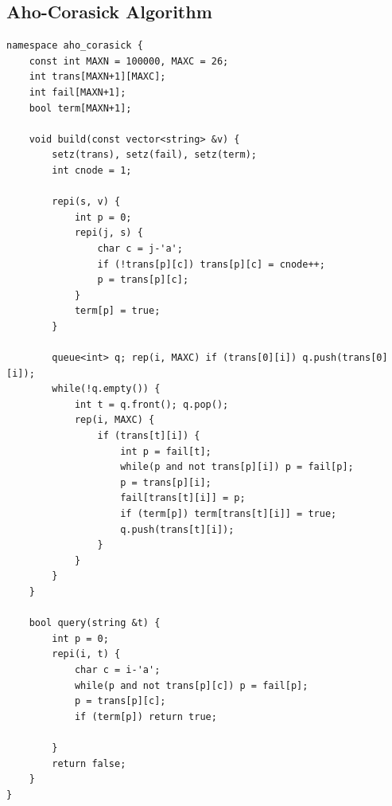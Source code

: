 \documentclass[landscape, 8pt, a4paper, oneside, twocolumn]{extarticle}
\begin{document}
\subsection{Aho-Corasick Algorithm}
\begin{verbatim}
namespace aho_corasick {
    const int MAXN = 100000, MAXC = 26;
    int trans[MAXN+1][MAXC];
    int fail[MAXN+1];
    bool term[MAXN+1];

    void build(const vector<string> &v) {
        setz(trans), setz(fail), setz(term);
        int cnode = 1;

        repi(s, v) {
            int p = 0;
            repi(j, s) {
                char c = j-'a';
                if (!trans[p][c]) trans[p][c] = cnode++;
                p = trans[p][c];
            }
            term[p] = true;
        }

        queue<int> q; rep(i, MAXC) if (trans[0][i]) q.push(trans[0][i]);
        while(!q.empty()) {
            int t = q.front(); q.pop();
            rep(i, MAXC) {
                if (trans[t][i]) {
                    int p = fail[t];
                    while(p and not trans[p][i]) p = fail[p];
                    p = trans[p][i];
                    fail[trans[t][i]] = p;
                    if (term[p]) term[trans[t][i]] = true;
                    q.push(trans[t][i]);
                }
            }
        }
    }

    bool query(string &t) {
        int p = 0;
        repi(i, t) {
            char c = i-'a';
            while(p and not trans[p][c]) p = fail[p];
            p = trans[p][c];
            if (term[p]) return true;

        }
        return false;
    }
}
\end{verbatim}
\end{document}
